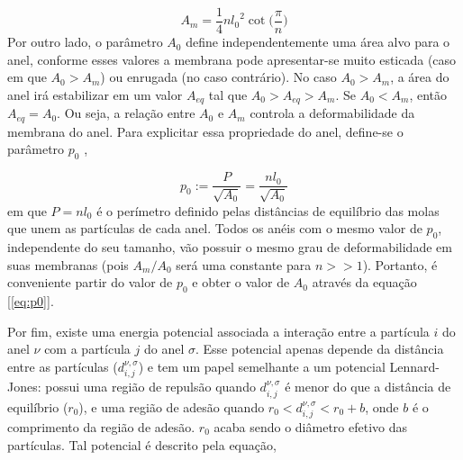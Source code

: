 \documentclass{article}
\theoremstyle{definition}
\def \quantitygsc#1#2#3#4#5{{#1}_{#2, #3}^{#4, #5}}
\def \deslocgsc#1#2#3#4{\quantitygsc{d}{#1}{#2}{#3}{#4}}
\begin{document}
\begin{equation}
    A_m = \frac{1}{4}n{l_0}^2\cot\bigg(\frac{\pi}{n}\bigg)
    \label{eq:spring_area}
\end{equation}
Por outro lado, o parâmetro $A_0$ define independentemente uma área alvo para o anel, conforme esses valores a membrana pode apresentar-se muito esticada (caso em que $A_0 > A_m$) ou enrugada (no caso contrário). No caso $A_0 > A_m$, a área do anel irá estabilizar em um valor $A_{eq}$ tal que $A_0 > A_{eq} > A_m$. Se $A_0 < A_m$, então $A_{eq} = A_0$.
Ou seja, a relação entre $A_0$ e $A_m$ controla a deformabilidade da membrana do anel. Para explicitar essa propriedade do anel, define-se o parâmetro $p_0$ \cite{bi_motility-driven_2016},

\begin{equation}
    p_0 := \frac{P}{\sqrt{A_0}} = \frac{n l_0}{\sqrt{A_0}}
    \label{eq:p0}
\end{equation}
em que $P = n l_0$ é o perímetro definido pelas distâncias de equilíbrio das molas que unem as partículas de cada anel. Todos os anéis com o mesmo valor de $p_0$, independente do seu tamanho, vão possuir o mesmo grau de deformabilidade em suas membranas (pois $A_m/A_0$ será uma constante para $n >> 1$).
Portanto, é conveniente partir do valor de $p_0$ e obter o valor de $A_0$ através da equação [\ref{eq:p0}].

Por fim, existe uma energia potencial associada a interação entre a partícula $i$ do anel $\nu$ com a partícula $j$ do anel $\sigma$. Esse potencial apenas depende da distância entre as partículas ($\deslocgsc{i}{j}{\nu}{\sigma}$) e tem um papel semelhante a um potencial Lennard-Jones: possui uma região de repulsão quando $\deslocgsc{i}{j}{\nu}{\sigma}$ é menor do que a distância de equilíbrio ($r_0$), e uma região de adesão quando $r_0 < \deslocgsc{i}{j}{\nu}{\sigma} < r_0 + b$, onde $b$ é o comprimento da região de adesão. $r_0$ acaba sendo o diâmetro efetivo das partículas. Tal potencial é descrito pela equação, %
\end{document}
